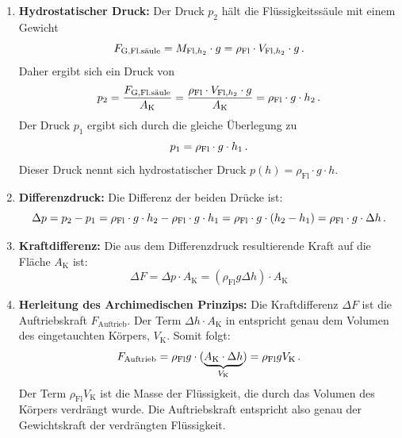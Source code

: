 \documentclass[ngerman]{scrreprt}
\newenvironment{loesungbox}[1]
  {\needspace{5\baselineskip}\begin{loesungboxstyle}[frametitle={#1}]}
  {\end{loesungboxstyle}}
\begin{document}
\begin{loesungbox}{Lösung zu \Cref{aufg:auftrieb_herleitung}}
\begin{enumerate}
    \item \textbf{Hydrostatischer Druck:}
    Der Druck $p_2$ hält die Flüssigkeitssäule mit einem Gewicht 
    $$F_{\text{G,Fl.säule}} = M_{\text{Fl},h_2} \cdot g = \rho_\text{Fl} \cdot V_{\text{Fl},h_2} \cdot g \,.$$
    Daher ergibt sich ein Druck von 
    $$p_2 = \frac{F_{\text{G,Fl.säule}}}{A_{\text{K}}} = \frac{\rho_{\text{Fl}} \cdot V_{\text{Fl},h_2} \cdot g}{A_\text{K}} = \rho_{\text{Fl}}\cdot g \cdot h_2 \,.$$
    Der Druck $p_1$ ergibt sich durch die gleiche Überlegung zu 
    $$p_1 = \rho_{\text{Fl}}\cdot g \cdot h_1 \,.$$
    Dieser Druck nennt sich hydrostatischer Druck $p(h) = \rho_\text{Fl} \cdot g \cdot h$.

    \item \textbf{Differenzdruck:}
    Die Differenz der beiden Drücke ist:
    \begin{equation}
        \Delta p = p_2 - p_1 = \rho_{\text{Fl}}\cdot g \cdot h_2 - \rho_{\text{Fl}}\cdot g\cdot h_1 = \rho_{\text{Fl}}\cdot g\cdot (h_2 - h_1) = \rho_{\text{Fl}}\cdot g\cdot \Delta h \,.
    \end{equation}
    
    \item \textbf{Kraftdifferenz:}
    Die aus dem Differenzdruck resultierende Kraft auf die Fläche $A_\text{K}$ ist: 
    \begin{equation}
        \Delta F = \Delta p \cdot A_\text{K} = (\rho_{\text{Fl}} g \Delta h) \cdot A_\text{K} \label{eq: deltaF_auftrieb}
    \end{equation}
    
    \item \textbf{Herleitung des Archimedischen Prinzips:}
    Die Kraftdifferenz $\Delta F$ ist die Auftriebskraft $F_{\text{Auftrieb}}$. Der Term $\Delta h \cdot A_\text{K}$ in  entspricht genau dem Volumen des eingetauchten Körpers, $V_\text{K}$. Somit folgt:
    \begin{equation}
        F_{\text{Auftrieb}} = \rho_{\text{Fl}} g \cdot (\underbrace{A_\text{K}\cdot \Delta h}_{V_\text{K}}) = \rho_{\text{Fl}} g V_\text{K} \,.
    \end{equation}
    Der Term $\rho_{\text{Fl}} V_\text{K}$ ist die Masse der Flüssigkeit, die durch das Volumen des Körpers verdrängt wurde. Die Auftriebskraft entspricht also genau der Gewichtskraft der verdrängten Flüssigkeit. 
\end{enumerate}
\end{loesungbox}
\end{document}
